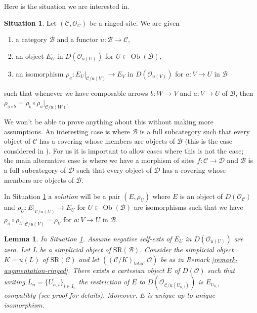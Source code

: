 \documentclass{stacks-project}
\theoremstyle{plain}
\newtheorem{lemma}[subsection]{Lemma}
\theoremstyle{definition}
\newtheorem{situation}[subsection]{Situation}
\theoremstyle{remark}
\numberwithin{equation}{subsection}
\def\Ob{\mathop{\mathrm{Ob}}\nolimits}
\begin{document}
\medskip\noindent
Here is the situation we are interested in.

\begin{situation}
\label{situation-locally-given}
Let $(\mathcal{C}, \mathcal{O}_\mathcal{C})$ be a ringed site. We are given
\begin{enumerate}
\item a category $\mathcal{B}$ and a functor
$u : \mathcal{B} \to \mathcal{C}$,
\item an object $E_U$ in $D(\mathcal{O}_{u(U)})$ for $U \in \Ob(\mathcal{B})$,
\item an isomorphism $\rho_a : E_U|_{\mathcal{C}/u(V)} \to E_V$ in
$D(\mathcal{O}_{u(V)})$ for $a : V \to U$ in $\mathcal{B}$
\end{enumerate}
such that whenever we have composable arrows
$b : W \to V$ and $a : V \to U$ of $\mathcal{B}$, then
$\rho_{a \circ b} = \rho_b \circ \rho_a|_{\mathcal{C}/u(W)}$.
\end{situation}

\noindent
We won't be able to prove anything about this without making more
assumptions. An interesting case is where $\mathcal{B}$ is a full
subcategory such that every object of $\mathcal{C}$ has a covering
whose members are objects of $\mathcal{B}$ (this is the case considered
in \cite{BBD}). For us it is important to allow cases where this is not
the case; the main alternative case is where we have a morphism
of sites $f : \mathcal{C} \to \mathcal{D}$ and $\mathcal{B}$
is a full subcategory of $\mathcal{D}$ such that every object of
$\mathcal{D}$ has a covering whose members are objects of $\mathcal{B}$.

\medskip\noindent
In Situation \ref{situation-locally-given} a {\it solution}
will be a pair $(E, \rho_U)$ where $E$ is an object of
$D(\mathcal{O}_\mathcal{C})$
and $\rho_U : E|_{\mathcal{C}/u(U)} \to E_U$
for $U \in \Ob(\mathcal{B})$
are isomorphisms such that
we have $\rho_a \circ \rho_U|_{\mathcal{C}/u(V)} = \rho_V$
for $a : V \to U$ in $\mathcal{B}$.

\begin{lemma}
\label{lemma-prepare-bbd-glueing}
In Situation \ref{situation-locally-given}.
Assume negative self-exts of $E_U$ in $D(\mathcal{O}_{u(U)})$ are zero.
Let $L$ be a simplicial object of $\text{SR}(\mathcal{B})$.
Consider the simplicial object $K = u(L)$ of $\text{SR}(\mathcal{C})$
and let $((\mathcal{C}/K)_{total}, \mathcal{O})$ be as in
Remark \ref{remark-augmentation-ringed}.
There exists a cartesian object $E$ of $D(\mathcal{O})$
such that writing $L_n = \{U_{n, i}\}_{i \in I_n}$
the restriction of $E$ to $D(\mathcal{O}_{\mathcal{C}/u(U_{n, i})})$
is $E_{U_{n, i}}$ compatibly (see proof for details).
Moreover, $E$ is unique up to unique isomorphism.
\end{lemma}
\end{document}
